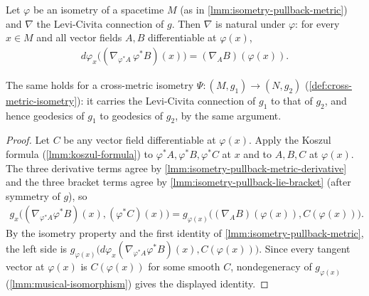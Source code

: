 \begin{lemma}
    \label{lmm:isometry-preserves-levi-civita}
    \leanok
    Let $\varphi$ be an isometry of a spacetime $M$ (as in \ref{lmm:isometry-pullback-metric}) and $\nabla$ the Levi-Civita connection of $g$. Then $\nabla$ is natural under $\varphi$: for every $x \in M$ and all vector fields $A, B$ differentiable at $\varphi(x)$,
    \begin{align}
        d\varphi_x\big((\nabla_{\varphi^* A}\, \varphi^* B)(x)\big) = (\nabla_A B)(\varphi(x)).
    \end{align}

    The same holds for a cross-metric isometry $\Psi : (M, g_1) \to (N, g_2)$ (\ref{def:cross-metric-isometry}): it carries the Levi-Civita connection of $g_1$ to that of $g_2$, and hence geodesics of $g_1$ to geodesics of $g_2$, by the same argument.
\end{lemma}
\begin{proof}
    \leanok
    Let $C$ be any vector field differentiable at $\varphi(x)$. Apply the Koszul formula (\ref{lmm:koszul-formula}) to $\varphi^* A, \varphi^* B, \varphi^* C$ at $x$ and to $A, B, C$ at $\varphi(x)$. The three derivative terms agree by \ref{lmm:isometry-pullback-metric-derivative} and the three bracket terms agree by \ref{lmm:isometry-pullback-lie-bracket} (after symmetry of $g$), so
    \begin{align}
        g_x\big((\nabla_{\varphi^* A}\varphi^* B)(x), (\varphi^* C)(x)\big) = g_{\varphi(x)}\big((\nabla_A B)(\varphi(x)), C(\varphi(x))\big).
    \end{align}
    By the isometry property and the first identity of \ref{lmm:isometry-pullback-metric}, the left side is $g_{\varphi(x)}\big(d\varphi_x (\nabla_{\varphi^* A}\varphi^* B)(x), C(\varphi(x))\big)$. Since every tangent vector at $\varphi(x)$ is $C(\varphi(x))$ for some smooth $C$, nondegeneracy of $g_{\varphi(x)}$ (\ref{lmm:musical-isomorphism}) gives the displayed identity.
\end{proof}

